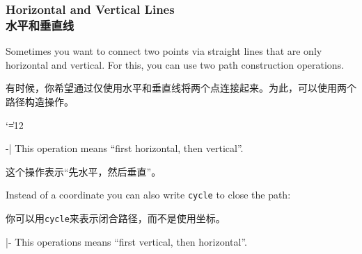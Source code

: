 \subsubsection{Horizontal and Vertical Lines\\水平和垂直线}

Sometimes you want to connect two points via straight lines that are only
horizontal and vertical. For this, you can use two path construction
operations.

有时候，你希望通过仅使用水平和垂直线将两个点连接起来。为此，可以使用两个路径构造操作。



{\catcode`\|=12
\begin{pathoperation}[noindex]{-|}{}
    \pgfmanualpdflabel[\catcode`\|=12 ]{-|}{}%
    This operation means ``first horizontal, then vertical''.
    
    
    这个操作表示“先水平，然后垂直”。
%
\begin{codeexample}[]
\end{codeexample}
    Instead of a coordinate you can also write \verb!cycle! to close the path:

    你可以用\verb!cycle!来表示闭合路径，而不是使用坐标。



\begin{codeexample}[]
\end{codeexample}
\end{pathoperation}

\begin{pathoperation}[noindex]{|-}{}
    \pgfmanualpdflabel[\catcode`\|=12 ]{|-}{}%
    This operations means ``first vertical, then horizontal''.
\end{pathoperation}
}


